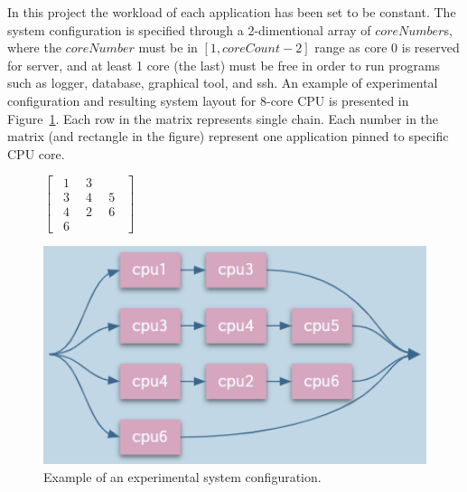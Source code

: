 \documentclass[english]{kththesis}
\begin{document}
In this project the workload of each application has been set to be constant. The system configuration is specified through a 2-dimentional array of \(coreNumber\)s, where the \( coreNumber \) must be in \([1, coreCount - 2]\) range as core 0 is reserved for server, and at least 1 core (the last) must be free in order to run programs such as logger, database, graphical tool, and ssh. An example of experimental configuration and resulting system layout for 8-core CPU is presented in Figure~\ref{fig:input}. Each row in the matrix represents single chain. Each number in the matrix (and rectangle in the figure) represent one application pinned to specific CPU core.

\begin{figure}
    \begin{minipage}[b]{.35\textwidth}
        \centering
        $\begin{bmatrix}
            \phantom{1}1\phantom{1} & 3\phantom{1}\\
            \phantom{1}3\phantom{1} & 4\phantom{1} & 5\phantom{1}\\
            \phantom{1}4\phantom{1} & 2\phantom{1} & 6\phantom{1}\\
            \phantom{1}6\phantom{1}
        \end{bmatrix}$
        \newline\newline\newline
    \end{minipage}
    \hfill
    \centering
    \begin{minipage}[b]{.64\textwidth}
        \includegraphics[width=1\textwidth]{Fig7}
    \end{minipage}
    \caption{Example of an experimental system configuration.}
    \label{fig:input}
\end{figure}
\end{document}
